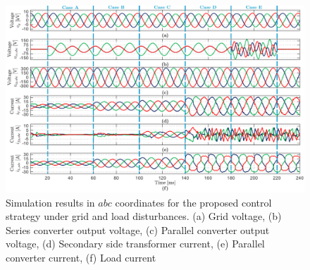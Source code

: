 \begin{figure}[t!]
    \centering
    \includegraphics[width=\textwidth]{Images/Simulation_Results.pdf}
    \caption{Simulation results in $abc$ coordinates for the proposed control strategy under grid and load disturbances. (a) Grid voltage, (b) Series converter output voltage, (c) Parallel converter output voltage, (d) Secondary side transformer current, (e) Parallel converter current, (f) Load current}
    \label{fig:Sim_results}
\end{figure}